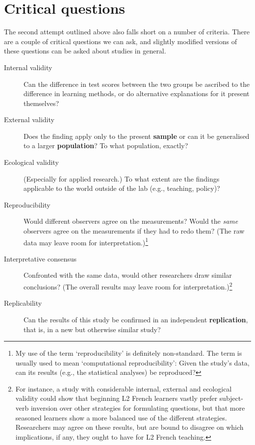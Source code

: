 \documentclass[a4paper]{tufte-book}\usepackage[]{graphicx}\usepackage[]{xcolor}
\newcommand{\term}[1]{\textbf{#1}}
\begin{document}
\section{Critical questions}\label{sec:validitaet}%

The second attempt outlined above also falls short on a number of criteria.
There are a couple of critical questions we can ask, and slightly modified
versions of these questions can be asked about studies in general.

\begin{description}
 \item[Internal validity]
 Can the difference in test scores between the two groups
 be ascribed to the difference in learning methods,
 or do alternative explanations for it present themselves?

 \item[External validity]
 Does the finding apply only to the present \term{sample}
 or can it be generalised to a larger \term{population}?
 To what population, exactly?

 \item[Ecological validity]
 (Especially for applied research.)
 To what extent are the findings applicable
 to the world outside of the lab
 (e.g., teaching, policy)?
 
 \item[Reproducibility]
 Would different observers agree on the measurements?
 Would the \emph{same} observers agree on the measurements if they had to redo them?
 (The raw data may leave room for interpretation.)\footnote{My use of the term `reproducibility' is definitely non-standard.
 The term is usually used to mean `computational reproducibility': Given the study's data, can its results (e.g., the statistical analyses) be reproduced?}
 
  \item[Interpretative consensus]
 Confronted with the same data, would other researchers draw similar conclusions?
 (The overall results may leave room for interpretation.)\footnote{For instance,
 a study with considerable internal, external and ecological validity could show
 that beginning L2 French learners vastly prefer subject-verb inversion over other strategies
 for formulating questions, but that more seasoned learners show a more balanced
 use of the different strategies. Researchers may agree on these results, but
 are bound to disagree on which implications, if any, they ought to have for
 L2 French teaching.}

 \item[Replicability]
 Can the results of this study be confirmed
 in an independent \term{replication},
 that is, in a new but otherwise similar study?
\end{description}
\end{document}
